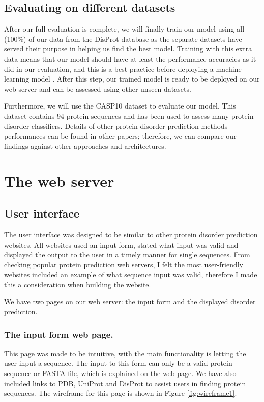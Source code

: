 \documentclass{l4proj}
\begin{document}
\subsection{Evaluating on different datasets}
After our full evaluation is complete, we will finally train our model using all (100\%) of our data from the DisProt database as the separate datasets have served their purpose in helping us find the best model. Training with this extra data means that our model should have at least the performance accuracies as it did in our evaluation, and this is a best practice before deploying a machine learning model \citep{Brownlee:17}. After this step, our trained model is ready to be deployed on our web server and can be assessed using other unseen datasets. 

Furthermore, we will use the CASP10 dataset to evaluate our model. This dataset contains 94 protein sequences \citep{Moult:14} and has been used to assess many protein disorder classifiers. Details of other protein disorder prediction methods performances can be found in other papers; therefore, we can compare our findings against other approaches and architectures. 

\section{The web server}

\subsection{User interface}

The user interface was designed to be similar to other protein disorder prediction websites. All websites used an input form, stated what input was valid and displayed the output to the user in a timely manner for single sequences. From checking popular protein prediction web servers, I felt the most user-friendly websites included an example of what sequence input was valid, therefore I made this a consideration when building the website. 

We have two pages on our web server: the input form and the displayed disorder prediction.

\subsubsection{The input form web page.}

This page was made to be intuitive, with the main functionality is letting the user input a sequence. The input to this form can only be a valid protein sequence or FASTA file, which is explained on the web page. We have also included links to PDB, UniProt and DisProt to assist users in finding protein sequences. The wireframe for this page is shown in Figure \ref{fig:wireframe1}.
\end{document}
